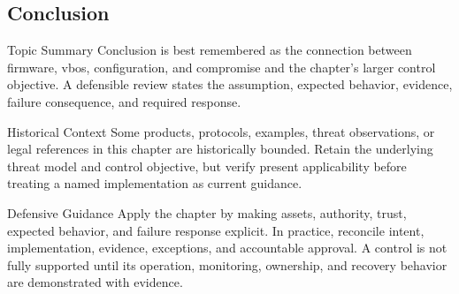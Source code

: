 \documentclass[11pt,letterpaper]{article}
\begin{document}
\subsection*{Conclusion}
\begin{CornellNotesTable}
\end{CornellNotesTable}
\begin{CornellSummaryBox}{Topic Summary}
Conclusion is best remembered as the connection between firmware, vbos, configuration, and compromise and the chapter's larger control objective. A defensible review states the assumption, expected behavior, evidence, failure consequence, and required response.
\end{CornellSummaryBox}
\begin{CornellWarningBox}{Historical Context}
Some products, protocols, examples, threat observations, or legal references in this chapter are historically bounded. Retain the underlying threat model and control objective, but verify present applicability before treating a named implementation as current guidance.
\end{CornellWarningBox}
\begin{CornellOverviewBox}{Defensive Guidance}
Apply the chapter by making assets, authority, trust, expected behavior, and failure response explicit. In practice, reconcile intent, implementation, evidence, exceptions, and accountable approval. A control is not fully supported until its operation, monitoring, ownership, and recovery behavior are demonstrated with evidence.
\end{CornellOverviewBox}
\end{document}

